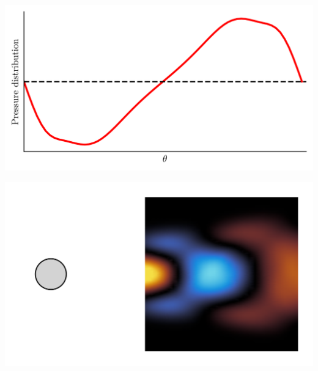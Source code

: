 \documentclass[aspectratio=169, usenames, dvipsnames]{beamer}
\begin{document}
{\begin{frame}
  \vspace{-1cm}
\end{frame}

\begin{frame}
  \vfill
  
  \begin{minipage}{.48\textwidth}
    \includegraphics[width=\textwidth]{pressure_distribution_cca_1}
  \end{minipage}%
  \hfill
  \begin{minipage}{.48\textwidth}
    \includegraphics[width=\textwidth]{vorticity_distribution_cca_1}
  \end{minipage}
  
  \vfill
\end{frame}


\begin{frame}
  \vfill
  

\end{frame}}
\end{document}
